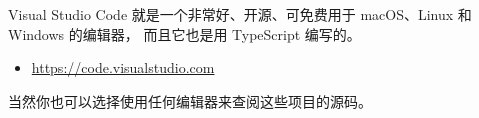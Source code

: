 
Visual Studio Code 就是一个非常好、开源、可免费用于 macOS、Linux 和 Windows 的编辑器，
而且它也是用 TypeScript 编写的。

\begin{itemize}
  \item \url{https://code.visualstudio.com}
\end{itemize}


当然你也可以选择使用任何编辑器来查阅这些项目的源码。



